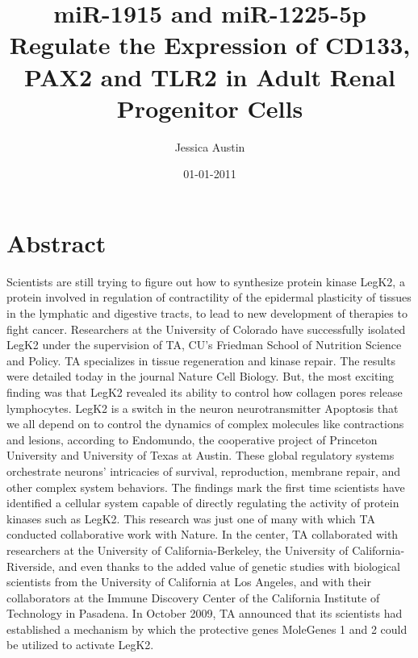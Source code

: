 \documentclass{article}%
\title{miR{-}1915 and miR{-}1225{-}5p Regulate the Expression of CD133, PAX2 and TLR2 in Adult Renal Progenitor Cells}%
\author{Jessica Austin}%
\affil{Department of Pathology, Microbiology and Immunology, School of Medicine, University of South Carolina, Columbia, South Carolina, United States of America}%
\date{01{-}01{-}2011}%
\begin{document}
%
\normalsize%
\maketitle%
\section{Abstract}%
\label{sec:Abstract}%
Scientists are still trying to figure out how to synthesize protein kinase LegK2, a protein involved in regulation of contractility of the epidermal plasticity of tissues in the lymphatic and digestive tracts, to lead to new development of therapies to fight cancer.\newline%
Researchers at the University of Colorado have successfully isolated LegK2 under the supervision of TA, CU's Friedman School of Nutrition Science and Policy. TA specializes in tissue regeneration and kinase repair.\newline%
The results were detailed today in the journal Nature Cell Biology.\newline%
But, the most exciting finding was that LegK2 revealed its ability to control how collagen pores release lymphocytes.\newline%
LegK2 is a switch in the neuron neurotransmitter Apoptosis that we all depend on to control the dynamics of complex molecules like contractions and lesions, according to Endomundo, the cooperative project of Princeton University and University of Texas at Austin.\newline%
These global regulatory systems orchestrate neurons' intricacies of survival, reproduction, membrane repair, and other complex system behaviors.\newline%
The findings mark the first time scientists have identified a cellular system capable of directly regulating the activity of protein kinases such as LegK2.\newline%
This research was just one of many with which TA conducted collaborative work with Nature.\newline%
In the center, TA collaborated with researchers at the University of California{-}Berkeley, the University of California{-}Riverside, and even  thanks to the added value of genetic studies  with biological scientists from the University of California at Los Angeles, and with their collaborators at the Immune Discovery Center of the California Institute of Technology in Pasadena.\newline%
In October 2009, TA announced that its scientists had established a mechanism by which the protective genes MoleGenes 1 and 2 could be utilized to activate LegK2.\newline%
\end{document}
